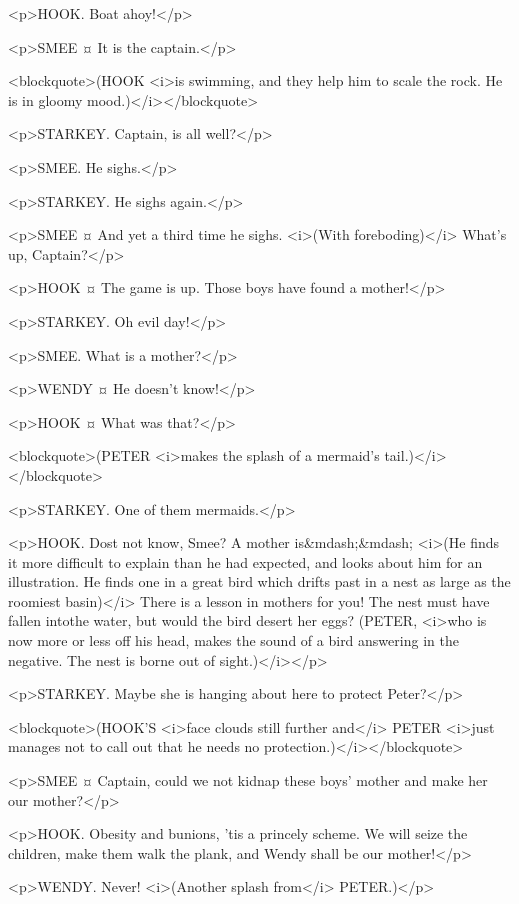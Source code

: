 <p>HOOK. Boat ahoy!</p>

<p>SMEE ¤
It is the captain.</p>

<blockquote>(HOOK <i>is swimming, and they help him to scale the rock. He is in gloomy mood.)</i></blockquote>

<p>STARKEY. Captain, is all well?</p>

<p>SMEE. He sighs.</p>

<p>STARKEY. He sighs again.</p>

<p>SMEE ¤
And yet a third time he sighs. <i>(With foreboding)</i> What's up, Captain?</p>

<p>HOOK ¤
The game is up. Those boys have found a mother!</p>

<p>STARKEY. Oh evil day!</p>

<p>SMEE. What is a mother?</p>

<p>WENDY ¤
He doesn't know!</p>

<p>HOOK ¤
What was that?</p>

<blockquote>(PETER <i>makes the splash of a mermaid's tail.)</i></blockquote>

<p>STARKEY. One of them mermaids.</p>

<p>HOOK. Dost not know, Smee? A mother is&mdash;&mdash; <i>(He finds it more difficult to explain than he had expected, and looks about him for an illustration. He finds one in a great bird which drifts past in a nest as large as the roomiest basin)</i> There is a lesson in mothers for you! The nest must have fallen intothe water, but would the bird desert her eggs? (PETER, <i>who is now more or less off his head, makes the sound of a bird answering in the negative. The nest is borne out of sight.)</i></p>

<p>STARKEY. Maybe she is hanging about here to protect Peter?</p>

<blockquote>(HOOK'S <i>face clouds still further and</i> PETER <i>just manages not to call out that he needs no protection.)</i></blockquote>

<p>SMEE ¤
Captain, could we not kidnap these boys' mother and make her our mother?</p>

<p>HOOK. Obesity and bunions, 'tis a princely scheme. We will seize the children, make them walk the plank, and Wendy shall be our mother!</p>

<p>WENDY. Never! <i>(Another splash from</i> PETER.)</p>

